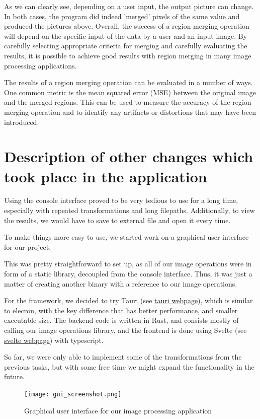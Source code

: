 \documentclass[12pt]{article}
\begin{document}
As we can clearly see, depending on a user input, the output picture can change. In both cases, the program did indeed 'merged' pixels of the same value and produced the pictures above. Overall, the success of a region merging operation will depend on the specific input of the data by a user and an input image. By carefully selecting appropriate criteria for merging and carefully evaluating the results, it is possible to achieve good results with region merging in many image processing applications.

The results of a region merging operation can be evaluated in a number of ways. One common metric is the mean squared error (MSE) between the original image and the merged regions. This can be used to measure the accuracy of the region merging operation and to identify any artifacts or distortions that may have been introduced. 


\section{Description of other changes which took place in the application}

Using the console interface proved to be very tedious to use for a long time,
especially with repeated transformations and long filepaths.
Additionally, to view the results, we would have to save to external file and open it every time.

To make things more easy to use, we started work on a graphical user interface for our project.

This was pretty straightforward to set up, as all of our image operations were in form of a static library, 
decoupled from the console interface. 
Thus, it was just a matter of creating another binary with a reference to our image operations.

For the framework, we decided to try Tauri (see \href{https://tauri.app/about/intro}{tauri webpage}), which is similar to elecron, with the key difference that has better performance, and smaller executable size.
The backend code is written in Rust, and consists mostly of calling our image operations library,
and the frontend is done using Svelte (see \href{https://svelte.dev}{svelte webpage}) with typescript.

So far, we were only able to implement some of the transformations from the previous tasks,
but with some free time we might expand the functionality in the future.

\begin{figure}[H]\centering
    \texttt{[image: gui\_screenshot.png]}
    \caption{Graphical user interface for our image processing application}
\end{figure}
\end{document}
